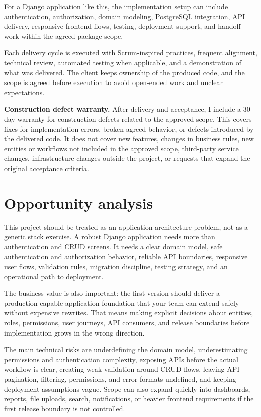 \documentclass[11pt,a4paper]{article}
\begin{document}
For a Django application like this, the implementation setup can include authentication, authorization, domain modeling, PostgreSQL integration, API delivery, responsive frontend flows, testing, deployment support, and handoff work within the agreed package scope.\par

Each delivery cycle is executed with Scrum-inspired practices, frequent alignment, technical review, automated testing when applicable, and a demonstration of what was delivered. The client keeps ownership of the produced code, and the scope is agreed before execution to avoid open-ended work and unclear expectations.\par

\textbf{Construction defect warranty.} After delivery and acceptance, I include a 30-day warranty for construction defects related to the approved scope. This covers fixes for implementation errors, broken agreed behavior, or defects introduced by the delivered code. It does not cover new features, changes in business rules, new entities or workflows not included in the approved scope, third-party service changes, infrastructure changes outside the project, or requests that expand the original acceptance criteria.\par

\section*{Opportunity analysis}

This project should be treated as an application architecture problem, not as a generic stack exercise. A robust Django application needs more than authentication and CRUD screens. It needs a clear domain model, safe authentication and authorization behavior, reliable API boundaries, responsive user flows, validation rules, migration discipline, testing strategy, and an operational path to deployment.\par

The business value is also important: the first version should deliver a production-capable application foundation that your team can extend safely without expensive rewrites. That means making explicit decisions about entities, roles, permissions, user journeys, API consumers, and release boundaries before implementation grows in the wrong direction.\par

The main technical risks are underdefining the domain model, underestimating permissions and authentication complexity, exposing APIs before the actual workflow is clear, creating weak validation around CRUD flows, leaving API pagination, filtering, permissions, and error formats undefined, and keeping deployment assumptions vague. Scope can also expand quickly into dashboards, reports, file uploads, search, notifications, or heavier frontend requirements if the first release boundary is not controlled.\par
\end{document}

